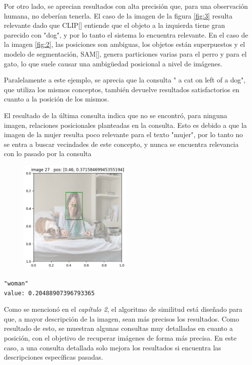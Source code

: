 Por otro lado, se aprecian resultados con alta precisión que, para una observación humana, no deberían tenerla. El caso de la imagen de la figura \ref{fig:3} resulta relevante dado que CLIP[\cite{clip}] entiende que el objeto a la izquierda tiene gran parecido con "dog", y por lo tanto el sistema lo encuentra relevante. En el caso de la imagen \ref{fig:2}, las posiciones son ambiguas, los objetos est\'an superpuestos y el modelo de segmentación, SAM[\cite{sam-paper}], genera particiones varias para el perro y para el gato, lo que suele causar una ambigüedad posicional a nivel de im\'agenes.

Paralelamente a este ejemplo, se aprecia que la consulta " a cat on left of a dog", que utiliza los mismos conceptos, también devuelve resultados satisfactorios en cuanto a la posición de los mismos.

El resultado de la última consulta indica que no se encontró, para ninguna imagen, relaciones posicionales planteadas en la consulta. Esto es debido a que la imagen de la mujer resulta poco relevante para el texto "mujer", por lo tanto no se entra a buscar vecindades de este concepto, y nunca se encuentra relevancia con lo pasado por la consulta


\begin{figure}[H]
\centering
 \includegraphics[width=0.5\textwidth]{Graphics/woman.png}
 \caption{ }
 \label{fig:woman}
\end{figure}

\begin{verbatim}
"woman"
value: 0.20488907396793365
\end{verbatim}

Como se mencionó en el \textit{capítulo 2}, el algoritmo de similitud est\'a diseñado para que, a mayor descripción de la imagen, sean m\'as precisos los resultados. Como resultado de esto, se muestran algunas consultas muy detalladas en cuanto a posición, con el objetivo de recuperar im\'agenes de forma m\'as precisa. En este caso, a una consulta detallada solo mejora los resultados si encuentra las descripciones específicas pasadas.

